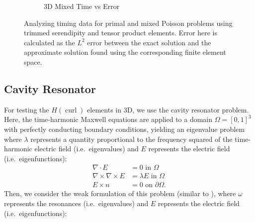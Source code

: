 \documentclass[format=acmsmall,screen,timestamp=false,a4paper]{acmart}
\DeclareMathOperator{\curl}{curl}
\newcommand{\hcurl}{\ensuremath{{H}(\curl)}\xspace}
\begin{document}
\begin{figure}[htbp]
\begin{subfigure}[h]{0.48\textwidth}
    \caption{3D Mixed Time vs Error \label{fig:3dMixedTimeError}}
  \end{subfigure}
  \caption{Analyzing timing data for primal and mixed Poisson problems using trimmed serendipity and tensor product elements.  Error here is calculated as the $L^2$ error between the exact solution and the approximate solution found using the corresponding finite element space.}
\label{fig:PrimalMixedTimeAnalysis}
\end{figure}

\subsection{Cavity Resonator}

For testing the \hcurl elements in 3D, we use the cavity resonator problem.  Here, the time-harmonic Maxwell equations are applied to a domain $\Omega = [0,1]^3$ with perfectly conducting boundary conditions, yielding an eigenvalue problem where $\lambda$ represents a quantity proportional to the frequency squared of the time-harmonic electric field (i.e.\ eigenvalues) and $E$ represents the electric field (i.e.\ eigenfunctions):
\begin{align*}
    \nabla \cdot E &= 0 \text{ in } \Omega \\
    \nabla \times \nabla \times E &= \lambda E  \text{ in } \Omega \\
    E \times n &= 0 \text{ on } \partial \Omega.
\end{align*}
Then, we consider the weak formulation of this problem (similar to \cite{fumio1987mixed}), where $\omega$ represents the resonances (i.e.\ eigenvalues) and $E$ represents the electric field (i.e.\ eigenfunctions):
\end{document}
